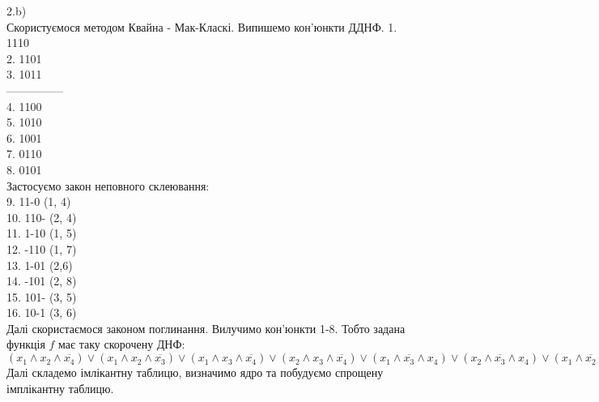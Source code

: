 \documentclass[14pt,a4paper]{scrartcl}
\theoremstyle{definition}
\newtheorem{defo}{Означення}[section]
\theoremstyle{remark}
\theoremstyle{definition}
\theoremstyle{definition}
\begin{document}
\def\be{\begin{equation}}
\def\ee{\end{equation}}

\def\bd{\begin{defo}}
\def\ed{\end{defo}}

\def\bbt{\begin{boxteo}}
\def\ebt{\end{boxteo}}

2.b)\\
Скористуємося методом Квайна - Мак-Класкі. Випишемо кон'юнкти ДДНФ.
1. 1110\\
2. 1101\\
3. 1011\\
---------------\\
4. 1100\\
5. 1010\\
6. 1001\\
7. 0110\\
8. 0101\\
Застосуємо закон неповного склеювання:\\
9. 11-0 (1, 4)\\
10. 110- (2, 4)\\
11. 1-10 (1, 5)\\
12. -110 (1, 7)\\
13. 1-01 (2,6)\\
14. -101 (2, 8)\\
15. 101- (3, 5)\\
16. 10-1 (3, 6)\\
Далі скористаємося законом поглинання. Вилучимо кон'юнкти 1-8. Тобто задана функція $f$ має таку скорочену ДНФ:\\
$(x_1 \wedge x_2 \wedge \overline{x_4})\vee (x_1 \wedge x_2 \wedge \overline{x_3}) \vee (x_1 \wedge x_3 \wedge \overline{x_4}) \vee (x_2 \wedge x_3 \wedge \overline{x_4}) \vee (x_1 \wedge \overline{x_3} \wedge x_4) \vee (x_2 \wedge \overline{x_3} \wedge x_4) \vee (x_1 \wedge \overline{x_2} \wedge x_3) \vee (x_1 \wedge \overline{x_2} \wedge x_4)$\\
Далі складемо імлікантну таблицю, визначимо ядро та побудуємо спрощену імплікантну таблицю.\\
\end{document}
